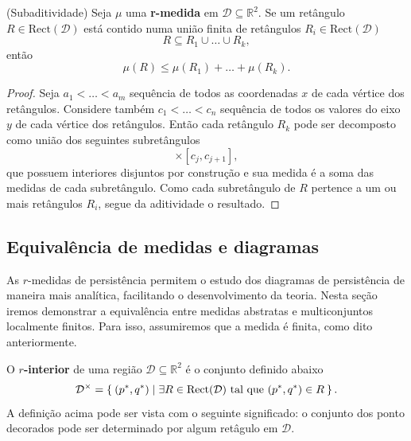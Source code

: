 \begin{propo}{(Subaditividade)} 
    Seja $\mu$ uma \textbf{r-medida} em $\mathcal{D} \subseteq \mathbb{R}^2$. Se um retângulo $R \in 
    \text{Rect}(\mathcal{D})$ está contido numa união finita de retângulos $R_i \in \text{Rect}(
    \mathcal{D})$
    \begin{equation*}
        R \subseteq R_1 \cup \dots \cup R_k,
    \end{equation*}
    então
    \begin{equation*}
        \mu(R) \leq \mu(R_1) + \dots + \mu(R_k).
    \end{equation*}
\end{propo}
\begin{proof}
    Seja $a_1 < \dots < a_m$ sequência de todos as coordenadas $x$ de cada vértice dos retângulos. 
    Considere também $c_1 < \dots < c_n$ sequência de todos os valores do eixo $y$ de cada vértice dos retângulos.
    Então cada retângulo $R_k$ pode ser decomposto como união dos seguintes subretângulos
    \begin{equation*}
        [a_i, a_{i+1}] \times [c_j, c_{j+1}],
    \end{equation*}
    que possuem interiores disjuntos por construção e sua medida é a soma das medidas de cada subretângulo. 
    Como cada subretângulo de $R$ pertence a um ou mais retângulos $R_i$, segue da aditividade o resultado.
\end{proof}

\subsection{Equivalência de medidas e diagramas}
As $r$-medidas de persistência permitem o estudo dos diagramas de persistência de maneira mais analítica,
facilitando o desenvolvimento da teoria. Nesta seção iremos demonstrar a equivalência entre medidas 
abstratas e multiconjuntos localmente finitos. Para isso, assumiremos que a medida é finita, como dito
anteriormente. 

O \textbf{$r$-interior} de uma região $\mathcal{D} \subseteq \mathbb{R}^2$ é o conjunto definido abaixo
\begin{equation*}
    \mathcal{D}^\times = \Set{(p^*, q^*) | \exists R \in \text{Rect}(\mathcal{D}) \text{ tal que }
    (p^*, q^*) \in R}.
\end{equation*}
A definição acima pode ser vista com o seguinte significado: o conjunto dos ponto decorados pode ser 
determinado por algum retâgulo em $\mathcal{D}$. 

